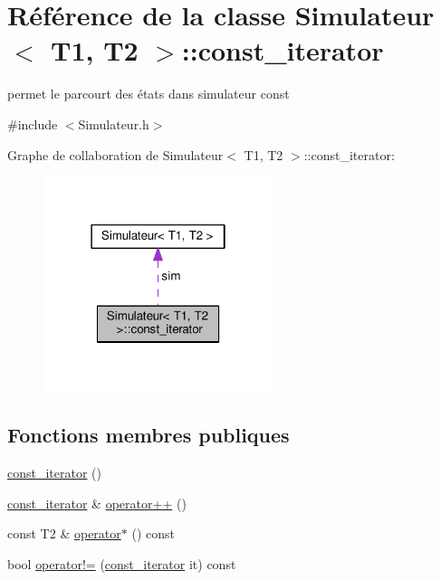 \hypertarget{class_simulateur_1_1const__iterator}{}\section{Référence de la classe Simulateur$<$ T1, T2 $>$\+:\+:const\+\_\+iterator}
\label{class_simulateur_1_1const__iterator}


permet le parcourt des états dans simulateur const  




{\ttfamily \#include $<$Simulateur.\+h$>$}



Graphe de collaboration de Simulateur$<$ T1, T2 $>$\+:\+:const\+\_\+iterator\+:\nopagebreak
\begin{figure}[H]
\begin{center}
\leavevmode
\includegraphics[width=190pt]{class_simulateur_1_1const__iterator__coll__graph}
\end{center}
\end{figure}
\subsection*{Fonctions membres publiques}
\begin{DoxyCompactItemize}
\item 
\hyperlink{class_simulateur_1_1const__iterator_adefd901a2eed44f15f00771cca1c940d}{const\+\_\+iterator} ()
\item 
\hyperlink{class_simulateur_1_1const__iterator}{const\+\_\+iterator} \& \hyperlink{class_simulateur_1_1const__iterator_ab5d1bea2f07780e6ae8d11a0accbfc87}{operator++} ()
\item 
const T2 \& \hyperlink{class_simulateur_1_1const__iterator_a4bc17b0d2decb5fb010155447f313c37}{operator$\ast$} () const 
\item 
bool \hyperlink{class_simulateur_1_1const__iterator_a1892ab7977db8b778365d94436652414}{operator!=} (\hyperlink{class_simulateur_1_1const__iterator}{const\+\_\+iterator} it) const 
\end{DoxyCompactItemize}
